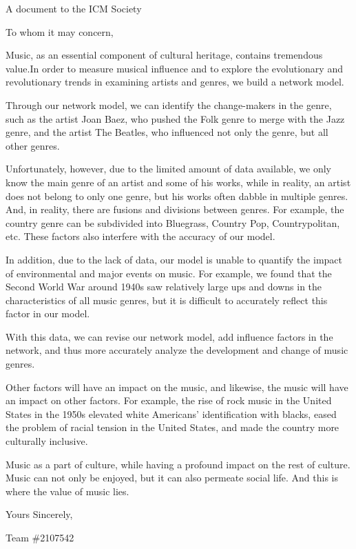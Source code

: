 \documentclass[12pt]{article}  %
\begin{document}
\begin{letter}{A document to the ICM Society}
	\begin{flushleft}  %
	To whom it may concern,
	\end{flushleft}

Music, as an essential component of cultural heritage, contains tremendous value.In order to measure musical influence and to explore the evolutionary and revolutionary trends in examining artists and genres, we build a network model.

Through our network model, we can identify the change-makers in the genre, such as the artist Joan Baez, who pushed the Folk genre to merge with the Jazz genre, and the artist The Beatles, who influenced not only the genre, but all other genres.

Unfortunately, however, due to the limited amount of data available, we only know the main genre of an artist and some of his works, while in reality, an artist does not belong to only one genre, but his works often dabble in multiple genres. And, in reality, there are fusions and divisions between genres. For example, the country genre can be subdivided into Bluegrass, Country Pop, Countrypolitan, etc. These factors also interfere with the accuracy of our model.

In addition, due to the lack of data, our model is unable to quantify the impact of environmental and major events on music. For example, we found that the Second World War around 1940s saw relatively large ups and downs in the characteristics of all music genres, but it is difficult to accurately reflect this factor in our model.

With this data, we can revise our network model, add influence factors in the network, and thus more accurately analyze the development and change of music genres.

Other factors will have an impact on the music, and likewise, the music will have an impact on other factors. For example, the rise of rock music in the United States in the 1950s elevated white Americans' identification with blacks, eased the problem of racial tension in the United States, and made the country more culturally inclusive.%

Music as a part of culture, while having a profound impact on the rest of culture. Music can not only be enjoyed, but it can also permeate social life. And this is where the value of music lies.

\hfill Yours Sincerely,

\hfill Team $\#$2107542  
\end{letter}
\end{document}
